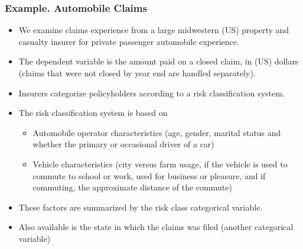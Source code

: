 \begin{frame}[shrink=2]
 \frametitle{Example. Automobile Claims}
   \begin{itemize}
  \item We examine claims experience from a large midwestern (US) property and casualty insurer for private
  passenger automobile experience.
 \item The dependent variable is the amount paid on a closed claim,
 in (US) dollars (claims that were not closed by year end are
 handled separately).
    \item Insurers categorize policyholders according to a risk
    classification system.
  \item The risk classification system is based on
      \begin{itemize}
    \item Automobile operator characteristics (age, gender, marital
    status and whether the primary or occasional driver of a car)
    \item Vehicle characteristics (city versus farm usage, if the vehicle is used to commute to school or
    work, used for business or pleasure, and if commuting, the
    approximate distance of the commute)
     \end{itemize}
\item These factors are summarized by the risk class categorical
variable.
\item Also available is the state in which the claims was filed
(another categorical variable)

     \end{itemize}
\end{frame}

